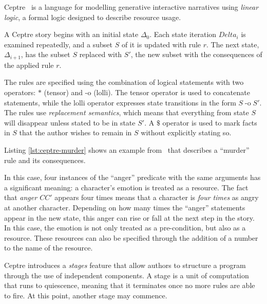Ceptre~\citep{martens2015ceptre} is a language for modelling generative interactive narratives using \emph{linear logic}, a formal logic designed to describe resource usage. 

A Ceptre story begins with an initial state $\Delta_0$. Each state iteration
$Delta_i$ is examined repeatedly, and a subset $S$ of it is updated with rule
$r$. The next state, $\Delta_{i+1}$, has the subset $S$ replaced with $S'$, the
new subset with the consequences of the applied rule $r$.

The rules are specified using the combination of logical statements with two
operators: $*$ (tensor) and $\text{-o}$ (lolli). The tensor operator is used to
concatenate statements, while the lolli operator expresses state transitions in
the form $S \mathrel{\text{-o}} S'$. The rules use \emph{replacement semantics},
which means that everything from state $S$ will disappear unless stated to be in
state $S'$. A $\$$ operator is used to mark facts in $S$ that the author wishes
to remain in $S$ without explicitly stating so.

Listing \ref{lst:ceptre-murder} shows an example from~\cite{martens2015ceptre}
that describes a ``murder'' rule and its consequences.



In this case, four instances of the ``anger'' predicate with the same arguments
has a significant meaning: a character's emotion is treated as a resource. The
fact that \emph{anger $C C'$} appears four times means that a character is
\emph{four times} as angry at another character. Depending on how many times the
``anger'' statements appear in the new state, this anger can rise or fall at the
next step in the story. In this case, the emotion is not only treated as a
pre-condition, but also as a resource. These resources can also be specified
through the addition of a number to the name of the resource.

Ceptre introduces a \emph{stages} feature that allow authors to structure a
program through the use of independent components. A stage is a unit of
computation that runs to quiescence, meaning that it terminates once no more
rules are able to fire. At this point, another stage may commence.

